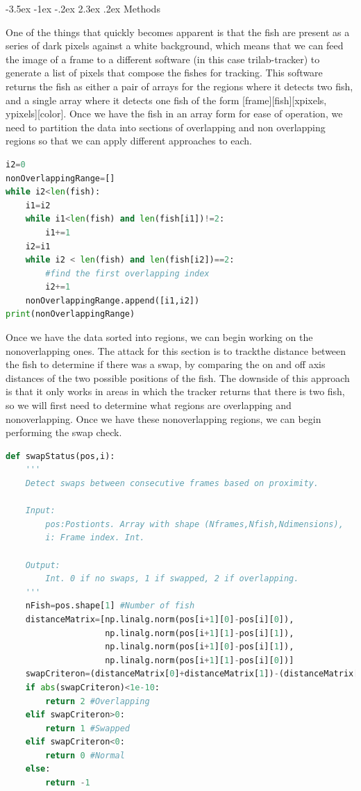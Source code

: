 \documentclass{article}
\makeatletter
\renewcommand\section{\clearpage\newpage\@startsection {section}{1}{\z@}%
	{-3.5ex \@plus -1ex \@minus -.2ex}%
	{2.3ex \@plus.2ex}%
	{\normalfont\Large\bfseries}}
\makeatother
\begin{document}
\section{Methods}

One of the things that quickly becomes apparent is that the fish are present as a series of dark pixels against a white background, which means that we can feed the image of a frame to a different software (in this case trilab-tracker) to generate a list of pixels that compose the fishes for tracking. This software returns the fish as either a pair of arrays for the regions where it detects two fish, and a single array where it detects one fish of the form [frame][fish][xpixels, ypixels][color]. Once we have the fish in an array form for ease of operation, we need to partition the data into sections of overlapping and non overlapping regions so that we can apply different approaches to each. 

\begin{minipage}[c]{\textwidth}
\begin{lstlisting}[language=Python]
i2=0
nonOverlappingRange=[]
while i2<len(fish):
    i1=i2
    while i1<len(fish) and len(fish[i1])!=2:
        i1+=1
    i2=i1
    while i2 < len(fish) and len(fish[i2])==2:
        #find the first overlapping index
        i2+=1
    nonOverlappingRange.append([i1,i2])
print(nonOverlappingRange)
\end{lstlisting}
\end{minipage}

Once we have the data sorted into regions, we can begin working on the nonoverlapping ones. The attack for this section is to trackthe distance between the fish to determine if there was a swap, by comparing the on and off axis distances of the two possible positions of the fish. The downside of this approach is that it only works in areas in which the tracker returns that there is two fish, so we will first need to determine what regions are overlapping and nonoverlapping. Once we have these nonoverlapping regions, we can begin performing the swap check. 

\begin{minipage}[c]{\textwidth}
\begin{lstlisting}[language=Python]
def swapStatus(pos,i):
    '''
    Detect swaps between consecutive frames based on proximity.
    
    Input:
        pos:Postionts. Array with shape (Nframes,Nfish,Ndimensions),
        i: Frame index. Int.
    
    Output:
        Int. 0 if no swaps, 1 if swapped, 2 if overlapping.
    '''
    nFish=pos.shape[1] #Number of fish
    distanceMatrix=[np.linalg.norm(pos[i+1][0]-pos[i][0]),
                    np.linalg.norm(pos[i+1][1]-pos[i][1]),
                    np.linalg.norm(pos[i+1][0]-pos[i][1]),
                    np.linalg.norm(pos[i+1][1]-pos[i][0])]
    swapCriteron=(distanceMatrix[0]+distanceMatrix[1])-(distanceMatrix[2]+distanceMatrix[3])
    if abs(swapCriteron)<1e-10:
        return 2 #Overlapping
    elif swapCriteron>0:
        return 1 #Swapped
    elif swapCriteron<0:
        return 0 #Normal
    else:
        return -1
\end{lstlisting}
\end{minipage}
\end{document}
